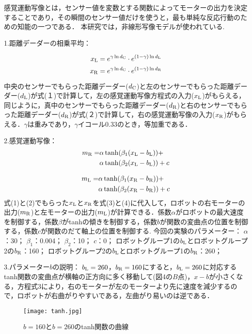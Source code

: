 感覚運動写像とは，センサー値を変数とする関数によってモーターの出力を決定することであり，その瞬間のセンサー値だけを使うと，最も単純な反応行動のための知能の一つである．
本研究では，非線形写像モデルが使われている.

1.距離デーダーの相乗平均：

\begin{equation}
  x_{\rm L} = e^{\gamma \ln d_{\rm C}} \cdot e^{(1-\gamma)\ln d_{\rm L}} 
\end{equation}
\begin{equation}
  x_{\rm R} = e^{\gamma \ln d_{\rm C}} \cdot e^{(1-\gamma)\ln d_{\rm R}} 
\end{equation}

中央のセンサーでもらった距離デーダー($d_{\rm C}$)と左のセンサーでもらった距離デーダー($d_{\rm L}$)が式(１)で計算して，左の感覚運動写像方程式の入力($x_{\rm L}$)がもらえる，同じように，真中のセンサーでもらった距離デーダー($d_{\rm R}$)と右のセンサーでもらった距離デーダー($d_{\rm R}$)が式(２)で計算して，右の感覚運動写像の入力($x_{\rm R}$)がもらえる．$\gamma$は重みであり，$\gamma$イコール0.33のとき，等加重である．

2.感覚運動写像：
\begin{equation}
\begin{aligned}
  m_{\rm R} = &\alpha \tanh(\beta_1(x_{\rm L} - b_{\rm L})) + \\
        &\alpha \tanh(\beta_2(x_{\rm L} - b_{\rm L})) + c
\end{aligned}
\end{equation}

\begin{equation}
\begin{aligned}
  m_{\rm L} = &\alpha \tanh(\beta_1(x_{\rm R} - b_{\rm R})) + \\
        &\alpha \tanh(\beta_2(x_{\rm R} - b_{\rm R})) + c
\end{aligned}
\end{equation}
式(1)と(2)でもらった$x_{\rm L}$と$x_{\rm R}$を式(3)と(4)に代入して，ロボットの右モーターの出力($m_{\rm R}$)と左モーターの出力($m_{\rm L}$)が計算できる．係数$\alpha$がロボットの最大速度を制御する，係数$\beta$が{\rm tanh}の傾きを制御する，係数$b$が関数の変曲点の位置を制御する，係数$c$が関数のだて軸上の位置を制御する. 
今回の実験のパラメーター：
$\alpha$：30；
$\beta_1$：0.004；
$\beta_2$：10；
$c$：0；
ロボットグループ1の$b_{\rm L}$とロボットグループ2の$b_{\rm R}$：160；
ロボットグループ2の$b_{\rm L}$とロボットグループ1の$b_{\rm R}$：260；
   
3.パラメーター$b$の説明：
$b_{\rm L}=260$，$b_{\rm R}=160$にすると，$b_{\rm L}=260$に対応するtanh関数の変曲点が横軸の正方向に多く移動して(図4の$B$点)，$x-b$が小さくなる，方程式3により，右のモーターが左のモーターより先に速度を減少するので，ロボットが右曲がりやすいである，左曲がり易いのは逆である．
\begin{figure}[!ht]
    \centering
    \texttt{[image: tanh.jpg]}
    \caption{$b=160$と$b=260$のtanh関数の曲線}
\end{figure}

